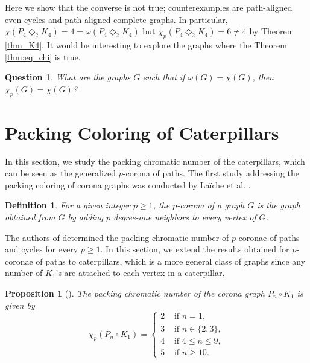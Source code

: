 \documentclass{article}
\newtheorem{definition}{Definition}
\newtheorem{question}{Question}
\newtheorem{prop}[theorem]{Proposition}
\begin{document}
Here we show that the converse is not true; counterexamples are path-aligned even cycles and path-aligned complete graphs. In particular, $\chi(P_{4}\Diamond_2 K_4) = 4 = \omega(P_{4}\Diamond_2 K_4)$ but $\chi_p(P_{4}\Diamond_2 K_4) =6 \ne 4$ by Theorem \ref{thm_K4}. It would be interesting to explore the graphs where the Theorem \ref{thm:eq_chi} is true.

\begin{question}
    What are the graphs $G$ such that if $\omega(G)=\chi(G)$, then $\chi_p(G)=\chi(G)$?
\end{question}

\section{Packing Coloring of Caterpillars} \label{sec:corona}

In this section, we study the packing chromatic number of the caterpillars, which can be seen as the generalized $p$-corona of paths. The first study addressing the packing coloring of corona graphs was conducted by Laïche et al. \cite{laiche2017packing}.
\begin{definition}
\emph{For a given integer $p \geq 1$, the}
 $p$-corona of a graph $G$ \emph{is the graph obtained from $G$ by adding $p$ degree-one
 neighbors to every vertex of $G$.}
\end{definition}  
The authors of \cite{laiche2017packing} determined the packing
 chromatic number of $p$-coronae of paths and cycles for every $p \geq 1$. In this section, we extend the results obtained for $p$-coronae of paths to caterpillars, which is a more general class of graphs since any number of $K_1$'s are attached to each vertex in a caterpillar.


\begin{prop}[\cite{laiche2017packing}]
The packing chromatic number of the corona  graph $P_n \circ K_1$ is given
 by
$$
\chi_p(P_n \circ K_1)=
\left\{
\begin{array}{ll}
2 & \text{ if } n=1,\\
3 & \text{ if } n\in\{2,3\},\\
4 & \text{ if } 4 \leq n \leq 9,\\
5 & \text{ if } n \geq 10.
\end{array}\right.
$$
\end{prop}

 
\end{document}
